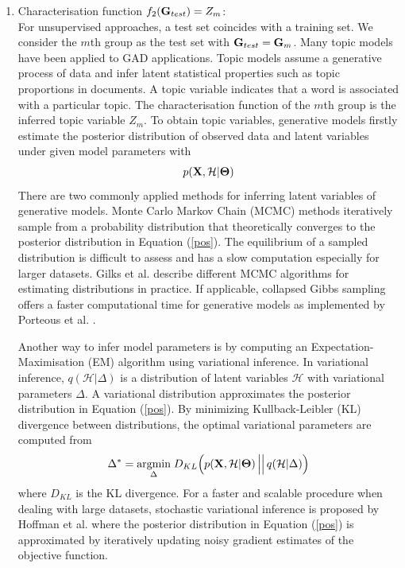 \begin{enumerate}[2.]
\item Characterisation function $f_2({\bf G}_{test})=Z_m$: \\ 
For unsupervised approaches, a test set coincides with a training set. We consider the $m$th group as the test set with  ${\bf G}_{test}={\bf G}_{m}$.  Many topic models have been applied to GAD applications. Topic models assume a generative process of data and  infer latent statistical properties such as topic proportions in documents. A topic variable indicates that a word is associated with a particular topic.  The characterisation function of the $m$th group is the inferred topic variable $ Z_m$.  
To obtain topic variables, generative models firstly estimate the posterior distribution of observed data and latent variables under given model parameters with %
\begin{align}
p({\bf X},\mathcal{H}| \boldsymbol\Theta) \label{pos}
\end{align}
There are two commonly applied methods for inferring latent variables of generative models. %
Monte Carlo Markov Chain (MCMC) methods iteratively  sample from a probability distribution that theoretically converges to the posterior distribution in Equation (\ref{pos}). The equilibrium of a sampled distribution is difficult to assess and has a slow computation especially for larger datasets. Gilks et al. \cite{MCMC} describe different MCMC algorithms for estimating distributions in practice. If applicable, collapsed Gibbs sampling offers a faster computational time for generative models as implemented by Porteous et al. \cite{fastCGS}.


 Another way to infer model parameters   is by   computing an Expectation-Maximisation (EM) algorithm  
  using variational inference. In variational inference, $q(\mathcal{H}|\Delta)$ is a  distribution of latent variables  $\mathcal{H}$ with variational parameters $\Delta$. A variational distribution approximates the  posterior distribution in Equation (\ref{pos}). By  minimizing Kullback-Leibler (KL) divergence between distributions, the optimal variational parameters are computed from 
\[ 
\Delta^* =  \underset {\Delta }{\mbox{argmin}} \;
D_{KL} \Big( p({\bf X},\mathcal{H}|   \boldsymbol\Theta) \,\Big|\Big|\,  q(\mathcal{H}|\Delta) \Big)
\]
where $D_{KL}$ is the KL divergence. For a faster and scalable procedure when dealing with large datasets, stochastic variational inference is proposed by Hoffman et al.    \cite{stochasticVI}    where the posterior distribution in  Equation (\ref{pos}) is approximated by iteratively  updating noisy gradient estimates of the objective function. 
\end{enumerate}
 
